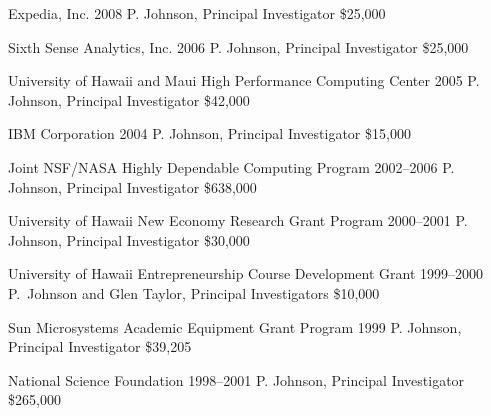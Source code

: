 \documentclass[11pt,letterpaper,sans]{moderncv} %
\begin{document}
        {Expedia, Inc.} %
        {2008} %
        {P. Johnson, Principal Investigator}  %
        {\$25,000} %

        {Sixth Sense Analytics, Inc.} %
        {2006} %
        {P. Johnson, Principal Investigator}  %
        {\$25,000} %

        {University of Hawaii and Maui High Performance Computing Center} %
        {2005} %
        {P. Johnson, Principal Investigator}  %
        {\$42,000} %

        {IBM Corporation} %
        {2004} %
        {P. Johnson, Principal Investigator}  %
        {\$15,000} %

        {Joint NSF/NASA Highly Dependable Computing Program} %
        {2002--2006} %
        {P. Johnson, Principal Investigator}  %
        {\$638,000} %

        {University of Hawaii New Economy Research Grant Program} %
        {2000--2001} %
        {P. Johnson, Principal Investigator}  %
        {\$30,000} %

        {University of Hawaii Entrepreneurship Course Development Grant} %
        {1999--2000} %
        {P.~Johnson and Glen Taylor, Principal Investigators}  %
        {\$10,000} %

        {Sun Microsystems Academic Equipment Grant Program} %
        {1999} %
        {P. Johnson, Principal Investigator}  %
        {\$39,205} %

        {National Science Foundation} %
        {1998--2001} %
        {P. Johnson, Principal Investigator}  %
        {\$265,000} %
\end{document}
